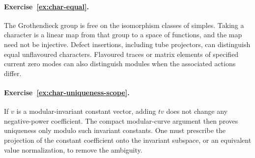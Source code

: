 \paragraph{Exercise~\ref{ex:char-equal}.}
\label{sol:ex:char-equal}
The Grothendieck group is free on the isomorphism classes
of simples. Taking a character is a linear map from that group
to a space of functions, and the map need not be injective.
Defect insertions, including tube projectors, can distinguish
equal unflavoured characters. Flavoured traces or matrix
elements of specified current zero modes can also distinguish
modules when the associated actions differ.



\paragraph{Exercise~\ref{ex:char-uniqueness-scope}.}
\label{sol:ex:char-uniqueness-scope}
If $v$ is a modular-invariant constant vector, adding $tv$
does not change any negative-power coefficient. The compact
modular-curve argument then proves uniqueness only modulo
such invariant constants. One must prescribe the projection
of the constant coefficient onto the invariant subspace,
or an equivalent value normalization, to remove the ambiguity.



